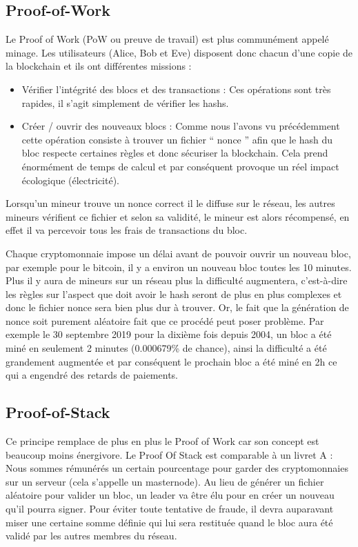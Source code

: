 \documentclass[12pt, a4paper, oneside]{book}
\begin{document}
    \subsection{Proof-of-Work}

    Le Proof of Work (PoW ou preuve de travail) est plus communément appelé minage. Les utilisateurs (Alice, Bob et Eve) disposent donc chacun d’une copie de la blockchain et ils ont différentes missions :

    \begin{itemize}
        \item Vérifier l’intégrité des blocs et des transactions : Ces opérations sont très rapides, il s’agit simplement de vérifier les hashs.
        \item Créer / ouvrir des nouveaux blocs : Comme nous l’avons vu précédemment cette opération consiste à trouver un fichier \hyphenquote{french}{ nonce } afin que le hash du bloc respecte certaines règles et donc sécuriser la blockchain. Cela prend énormément de temps de calcul et par conséquent provoque un réel impact écologique (électricité).
        \newline
    \end{itemize}

    Lorsqu’un mineur trouve un nonce correct il le diffuse sur le réseau, les autres mineurs vérifient ce fichier et selon sa validité, le mineur est alors récompensé, en effet il va percevoir tous les frais de transactions du bloc.
    \newline

    Chaque cryptomonnaie impose un délai avant de pouvoir ouvrir un nouveau bloc, par exemple pour le bitcoin, il y a environ un nouveau bloc toutes les 10 minutes.
    Plus il y aura de mineurs sur un réseau plus la difficulté augmentera, c'est-à-dire les règles sur l'aspect que doit avoir le hash seront de plus en plus complexes et donc le fichier nonce sera bien plus dur à trouver. \newline
    Or, le fait que la génération de nonce soit purement aléatoire fait que ce procédé peut poser problème. Par exemple le 30 septembre 2019 pour la dixième fois depuis 2004, un bloc a été miné en seulement 2 minutes (0.000679\% de chance),
    ainsi la difficulté a été grandement augmentée et par conséquent le prochain bloc a été miné en 2h ce qui a engendré des retards de paiements.

    \subsection{Proof-of-Stack}
    Ce principe remplace de plus en plus le Proof of Work car son concept est beaucoup moins énergivore. Le Proof Of Stack est comparable à un livret A : Nous sommes rémunérés un certain pourcentage pour garder des cryptomonnaies sur un serveur (cela s’appelle un masternode).
    Au lieu de générer un fichier aléatoire pour valider un bloc, un leader va être élu pour en créer un nouveau qu’il pourra signer. Pour éviter toute tentative de fraude, il devra auparavant miser une certaine somme définie qui lui sera restituée quand le bloc aura été validé par les autres membres du réseau.
\end{document}
